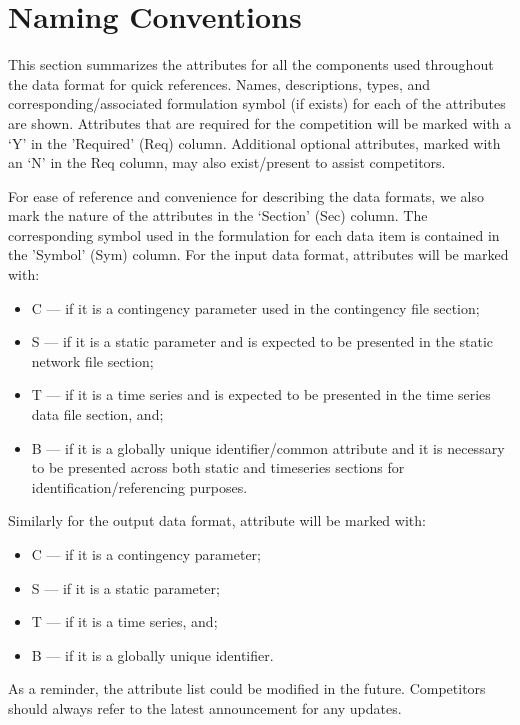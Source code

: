 \documentclass{article}
\begin{document}
\section{Naming Conventions}
\label{sec:naming}
This section summarizes the attributes for all the components used throughout the data format for quick references.
Names, descriptions, types, and corresponding/associated formulation symbol (if exists) for each of the attributes are shown.
Attributes that are required for the competition
will be marked with a `Y' in the 'Required' (Req) column.
Additional optional attributes, marked with an `N' in the Req column, may also exist/present to assist competitors.

For ease of reference and convenience for describing the data formats, we also
mark the nature of the attributes in the `Section' (Sec) column. The corresponding symbol used in the formulation for each data item is contained in the 'Symbol' (Sym) column.
For the input data format, attributes will be marked with:
\begin{itemize}
\item C --- if it is a contingency parameter used in the contingency file section;
\item S --- if it is a static parameter and is expected to be presented in the static network file section;
\item T --- if it is a time series and is expected to be presented in the time series data file section, and;
\item B --- if it is a globally unique identifier/common attribute and it is necessary to be presented across both static and timeseries sections for identification/referencing purposes.  
\end{itemize}
Similarly for the output data format, attribute will be marked with:
\begin{itemize}
\item C --- if it is a contingency parameter;   
\item S --- if it is a static parameter;
\item T --- if it is a time series, and;
\item B --- if it is a globally unique identifier.
\end{itemize}
As a reminder, the attribute list could be modified in the future.
Competitors should always refer to the latest announcement for any
updates.
\end{document}
